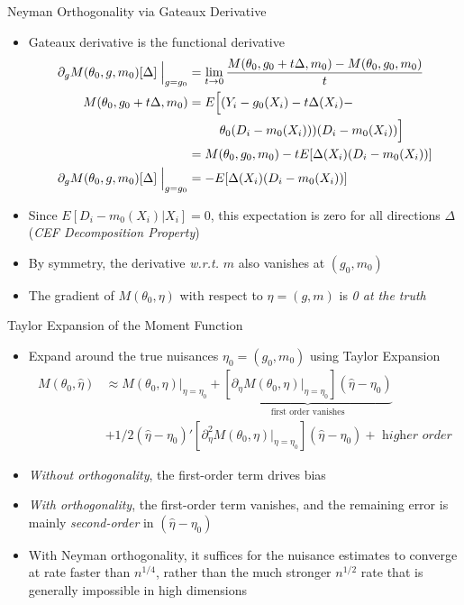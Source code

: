 \documentclass[aspectratio=1610,12pt,xcolor=dvipsnames]{beamer}
\begin{document}
\begin{frame}{Neyman Orthogonality via Gateaux Derivative}

\begin{itemize}
    \item Gateaux derivative is the functional derivative
    \begin{align*}
    \partial_g M(\theta_0,g,m_0)[\Delta]\;\Big|_{g=g_0} 
    &= \lim_{t \to 0} \frac{M(\theta_0,g_0+t\Delta,m_0) - M(\theta_0,g_0,m_0)}{t} \\
    M(\theta_0,g_0 + t\Delta,m_0) 
    &= E\Big[(Y_i - g_0(X_i) - t \Delta(X_i) - \\ &\hspace{2.5em} \theta_0(D_i-m_0(X_i)))(D_i-m_0(X_i))\Big] \\
    &= M(\theta_0,g_0,m_0) - t E[\Delta(X_i)(D_i-m_0(X_i))] \\
    \partial_g M(\theta_0,g,m_0)[\Delta]\;\Big|_{g=g_0} 
    &= -E[\Delta(X_i)(D_i-m_0(X_i))]
    \end{align*}
    \item Since $E[D_i-m_0(X_i) | X_i]=0$, this expectation is zero for all directions $\Delta$ (\textit{CEF Decomposition Property})
    \item By symmetry, the derivative \textit{w.r.t.} $m$ also vanishes at $(g_0,m_0)$
    \item The gradient of $M(\theta_0,\eta)$ with respect to $\eta=(g,m)$ is \textit{0 at the truth}
\end{itemize}
\end{frame}



\begin{frame}{Taylor Expansion of the Moment Function}

\begin{itemize}
    \item Expand around the true nuisances $\eta_0=(g_0,m_0)$ using Taylor Expansion
    \begin{align*}
M(\theta_0,\hat\eta)
    &\approx M(\theta_0,\eta)\Big|_{\eta=\eta_0} + \underbrace{\left[\partial_\eta M(\theta_0,\eta)\Big|_{\eta=\eta_0}\right](\hat\eta-\eta_0)}_{\text{first order vanishes}} \\
    &+ 1/2(\hat\eta-\eta_0)'\left[\partial^2_\eta M(\theta_0,\eta)\Big|_{\eta=\eta_0}\right](\hat\eta-\eta_0) + \textit{ higher order}
    \end{align*}
    \item \textit{Without orthogonality}, the first-order term drives bias
    \item \textit{With orthogonality}, the first-order term vanishes, and the remaining error is mainly \textit{second-order} in 
    $(\hat\eta-\eta_0)$
    \item With Neyman orthogonality, it suffices for the nuisance estimates to converge at rate faster than $n^{1/4}$, rather than the much stronger $n^{1/2}$ rate that is generally impossible in high dimensions
\end{itemize}
\end{frame}
\end{document}
